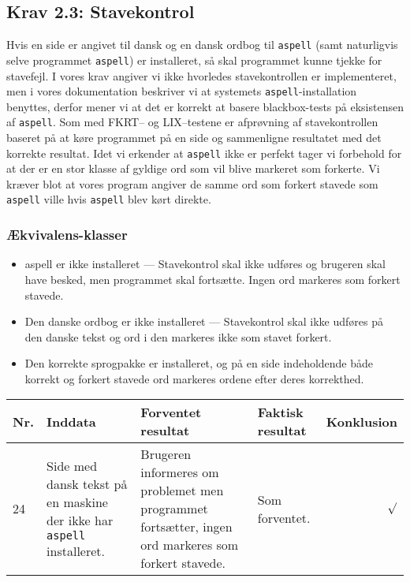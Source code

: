 \documentclass[a4paper,oneside,article]{memoir}
\begin{document}
\begin{landscape}
\begin{longtable}[c]{p{20pt}|p{220pt}|p{130pt}|p{130pt}|r}
\end{longtable}

\subsection{Krav 2.3: Stavekontrol}

Hvis en side er angivet til dansk og en dansk ordbog til
\texttt{aspell} (samt naturligvis selve programmet \texttt{aspell}) er
installeret, så skal programmet kunne tjekke for stavefejl. I vores
krav angiver vi ikke hvorledes stavekontrollen er implementeret, men i
vores dokumentation beskriver vi at systemets
\texttt{aspell}-installation benyttes, derfor mener vi at det er
korrekt at basere blackbox-tests på eksistensen af
\texttt{aspell}. Som med FKRT-- og LIX--testene er afprøvning af
stavekontrollen baseret på at køre programmet på en side og
sammenligne resultatet med det korrekte resultat. Idet vi erkender at
\texttt{aspell} ikke er perfekt tager vi forbehold for at der er en
stor klasse af gyldige ord som vil blive markeret som forkerte. Vi
kræver blot at vores program angiver de samme ord som forkert stavede
som \texttt{aspell} ville hvis \texttt{aspell} blev kørt direkte.

\subsubsection{Ækvivalens-klasser}
\begin{itemize}
\item aspell er ikke installeret --- Stavekontrol skal ikke udføres og
  brugeren skal have besked, men programmet skal fortsætte. Ingen ord
  markeres som forkert stavede.
\item Den danske ordbog er ikke installeret --- Stavekontrol skal ikke
  udføres på den danske tekst og ord i den markeres ikke som stavet
  forkert.
\item Den korrekte sprogpakke er installeret, og på en side
  indeholdende både korrekt og forkert stavede ord markeres ordene
  efter deres korrekthed. 
\end{itemize}

\begin{longtable}[c]{p{20pt}|p{220pt}|p{130pt}|p{130pt}|r}
\textbf{Nr.} &
\textbf{Inddata} &
\textbf{Forventet resultat} &
\textbf{Faktisk resultat} &
\textbf{Konklusion} \\ \hline

24 &
Side med dansk tekst på en maskine der ikke har \texttt{aspell}
installeret. &
Brugeren informeres om problemet men programmet fortsætter, ingen ord
markeres som forkert stavede. &
Som forventet. &
$\surd$ \\ \hline


\end{longtable}
\end{landscape}
\end{document}
